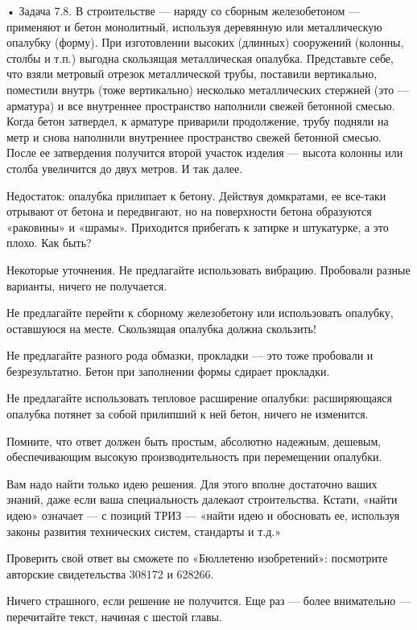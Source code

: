 •  Задача 7.8.  В строительстве  — наряду  со сборным  железобетоном —
применяют и  бетон монолитный, используя деревянную  или металлическую
опалубку  (форму).  При   изготовлении  высоких  (длинных)  сооружений
(колонны, столбы  и т.п.)  выгодна скользящая  металлическая опалубка.
Представьте  себе, что  взяли  метровый  отрезок металлической  трубы,
поставили вертикально,  поместили внутрь (тоже  вертикально) несколько
металлических стержней (это —  арматура) и все внутреннее пространство
наполнили свежей  бетонной смесью.  Когда бетон затвердел,  к арматуре
приварили  продолжение,  трубу  подняли  на  метр  и  снова  наполнили
внутреннее пространство  свежей бетонной смесью. После  ее затвердения
получится  второй   участок  изделия  —  высота   колонны  или  столба
увеличится до двух метров. И так далее.

Недостаток:  опалубка  прилипает  к бетону.  Действуя  домкратами,  ее
все-таки отрывают  от бетона и  передвигают, но на  поверхности бетона
образуются  «раковины» и  «шрамы».  Приходится прибегать  к затирке  и
штукатурке, а это плохо. Как быть?

Некоторые уточнения.  Не предлагайте использовать  вибрацию. Пробовали
разные варианты, ничего не получается.

Не  предлагайте  перейти  к  сборному  железобетону  или  использовать
опалубку, оставшуюся на месте. Скользящая опалубка должна скользить!

Не предлагайте разного рода обмазки,  прокладки — это тоже пробовали и
безрезультатно. Бетон при заполнении формы сдирает прокладки.

Не    предлагайте   использовать    тепловое   расширение    опалубки:
расширяющаяся опалубка потянет за собой  прилипший к ней бетон, ничего
не изменится.

Помните, что  ответ должен быть простым,  абсолютно надежным, дешевым,
обеспечивающим высокую производительность при перемещении опалубки.

Вам надо найти только идею  решения. Для этого вполне достаточно ваших
знаний, даже  если ваша специальность далекаот  строительства. Кстати,
«найти идею» означает — с позиций  ТРИЗ — «найти идею и обосновать ее,
используя законы развития технических систем, стандарты и т.д.»

Проверить свой ответ вы сможете по «Бюллетеню изобретений»: посмотрите
авторские свидетельства 308172 и 628266.

Ничего  страшного,  если  решение  не   получится.  Еще  раз  —  более
внимательно — перечитайте текст, начиная с шестой главы.


